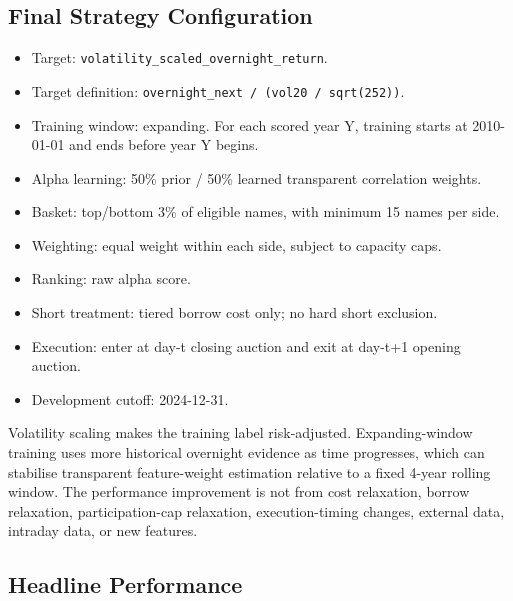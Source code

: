 \documentclass[
  10pt,
]{article}
\providecommand{\tightlist}{%
  \setlength{\itemsep}{0pt}\setlength{\parskip}{0pt}}
\begin{document}
\hypertarget{final-strategy-configuration}{%
\subsection{Final Strategy
Configuration}\label{final-strategy-configuration}}

\begin{itemize}
\tightlist
\item
  Target: \texttt{volatility\_scaled\_overnight\_return}.
\item
  Target definition: \texttt{overnight\_next\ /\ (vol20\ /\ sqrt(252))}.
\item
  Training window: expanding. For each scored year Y, training starts at
  2010-01-01 and ends before year Y begins.
\item
  Alpha learning: 50\% prior / 50\% learned transparent correlation
  weights.
\item
  Basket: top/bottom 3\% of eligible names, with minimum 15 names per
  side.
\item
  Weighting: equal weight within each side, subject to capacity caps.
\item
  Ranking: raw alpha score.
\item
  Short treatment: tiered borrow cost only; no hard short exclusion.
\item
  Execution: enter at day-t closing auction and exit at day-t+1 opening
  auction.
\item
  Development cutoff: 2024-12-31.
\end{itemize}

Volatility scaling makes the training label risk-adjusted.
Expanding-window training uses more historical overnight evidence as
time progresses, which can stabilise transparent feature-weight
estimation relative to a fixed 4-year rolling window. The performance
improvement is not from cost relaxation, borrow relaxation,
participation-cap relaxation, execution-timing changes, external data,
intraday data, or new features.

\hypertarget{headline-performance}{%
\subsection{Headline Performance}\label{headline-performance}}
\end{document}
